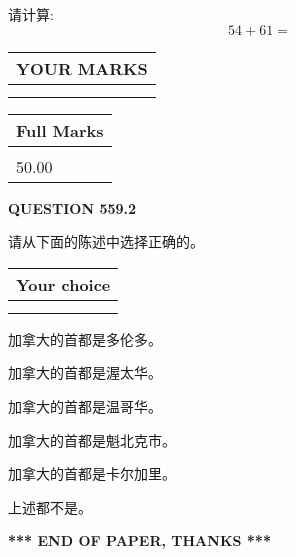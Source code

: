 \documentclass{ctexart}
\begin{document}
  
 
请计算:
\begin{equation}
54 +  %
61 = \nonumber
\end{equation}
 

 

 
  
\vspace{0.2in}
  
\noindent\begin{tabular}{|l|}
\hline
 YOUR MARKS  \\
\hline
 \\ 
 \\ 
\hline
\end{tabular}
\hspace{0.05in} \begin{tabular}{|l|}
\hline
 Full Marks  \\
\hline
 \\ 
50.00 \\
\hline
\end{tabular}
{\textbf{\Large{QUESTION
559.2 
}}}
  
  
请从下面的陈述中选择正确的。
  
  
\noindent\hspace{3.0in} \begin{tabular}{|l|}
\hline
Your choice \\
\hline
 \\ 
 \\ 
\hline
\end{tabular}
  
  
 
 
加拿大的首都是多伦多。
 
 
加拿大的首都是渥太华。
 
 
加拿大的首都是温哥华。
 
 
加拿大的首都是魁北克市。
 
 
加拿大的首都是卡尔加里。
 
 
 上述都不是。
 
 
   
   
 \vspace{0.2in}
 
   
   
   
   
\vspace{1.0in} 
{\textbf{\large{ *** END OF PAPER, THANKS *** }}} 
   
\end{document}

